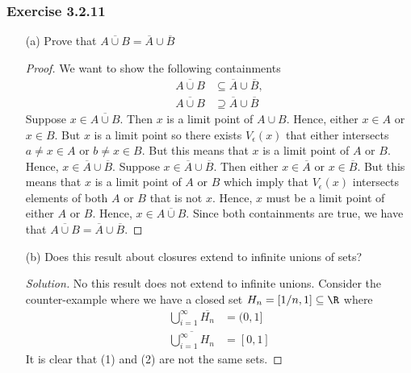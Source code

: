 \subsubsection{Exercise 3.2.11} 
\begin{enumerate}
    \item[(a)] Prove that \( \overline{A \cup  B} = \overline{A} \cup \overline{B} \)
        \begin{proof}
        We want to show the following containments 
        \begin{align*}
            \overline{A \cup B} &\subseteq \overline{A} \cup \overline{B}, \\
            \overline{A \cup B } &\supseteq \overline{A} \cup \overline{B}
        \end{align*}
        Suppose \( x \in \overline{A \cup B} \). Then \( x \) is a limit point of \( A \cup B \). Hence, either \( x  \in A \) or \( x \in B \). But \( x  \) is a limit point so there exists \( V_{\epsilon}(x) \) that either intersects \(a \neq x \in A \) or \( b \neq x \in B \). But this means that \( x  \) is a limit point of \( A \) or \( B \). Hence, \( x \in \overline{A} \cup \overline{B} \). 
        Suppose \( x \in \overline{A} \cup \overline{B} \). Then either \( x \in \overline{A} \) or \( x \in \overline{B} \). But this means that \( x  \) is a limit point of \( A  \) or \( B \) which imply that \( V_{\epsilon}(x) \) intersects elements of both \( A  \) or \( B \) that is not \( x \). Hence, \( x  \) must be a limit point of either \( A  \) or \( B \). Hence, \( x \in \overline{A \cup B} \).
        Since both containments are true, we have that \( \overline{A \cup B} = \overline{A} \cup \overline{B} \). 
        \end{proof}
    \item[(b)] Does this result about closures extend to infinite unions of sets? 
        \begin{proof}[Solution]
            No this result does not extend to infinite unions. Consider the counter-example where we have a closed set \( H_n = [1/n, 1] \subseteq \R  \) where 
            \begin{align*}
                \bigcup_{ i=1 }^{ \infty  } \overline{H_n} &= (0, 1] \tag{1} \\
                \overline{\bigcup_{ i=1 }^{ \infty  } H_n}  &= [0,1] \tag{2}
            \end{align*}
            It is clear that (1) and (2) are not the same sets. 
        \end{proof}
        
\end{enumerate}



